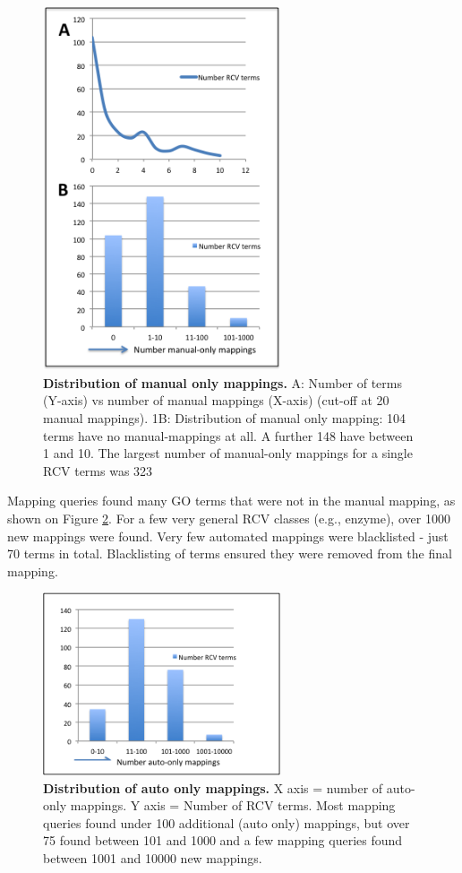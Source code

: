 \documentclass[runningheads,a4paper]{llncs}
\begin{document}
{{ 
\begin{figure}
\centering
\includegraphics[width=70mm]{man_only.png}
\caption{\textbf{Distribution of manual only mappings.} A: Number of terms (Y-axis) vs number of manual mappings (X-axis) (cut-off at 20 manual mappings). 1B: Distribution of manual only mapping: 104 terms have no manual-mappings at all.  A further 148 have between 1 and 10.  The largest number of manual-only mappings for a single RCV terms was 323}
\label{fig:man_only}
\end{figure}
 
Mapping queries found many \ac{GO} terms that were not in the manual mapping, as shown on Figure \ref{fig:auto_only}.  For a few very general RCV classes (e.g., enzyme), over 1000 new mappings were found. Very few automated mappings were blacklisted - just 70 terms in total.  Blacklisting of terms ensured they were removed from the final mapping.

\begin{figure}
\centering
\includegraphics[width=70mm]{auto_only.png}
\caption{\textbf{Distribution of auto only mappings.}
X axis = number of auto-only mappings.  Y axis = Number of RCV terms.  Most mapping queries found under 100 additional (auto only) mappings, but over 75 found between 101 and 1000 and a few mapping queries found between 1001 and 10000 new mappings.}
\label{fig:auto_only}
\end{figure}

}}
\end{document}
